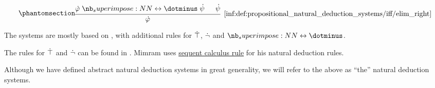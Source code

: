 \begin{definition}
\begin{thmenum}
\begin{paracol}{3}
      \begin{nthcolumn}{2}
        \ParacolAlignmentHack
        \begin{equation*}\taglabel[\ensuremath{ \leftrightarrow_{-R} }]{inf:def:propositional_natural_deduction_systems/iff/elim_right}
          \begin{prooftree}
            \hypo{ \syn\varphi \syniff \syn\psi }
            \hypo{ \syn\psi }
            \infer2[\ref{inf:def:propositional_natural_deduction_systems/iff/elim_right}]{ \syn\varphi }
          \end{prooftree}
        \end{equation*}
      \end{nthcolumn}
    \end{paracol}
  \end{thmenum}
\end{definition}
\begin{comments}
  \item The systems are mostly based on \cite[def. 2.1.1]{TroelstraSchwichtenberg2000BasicProofTheory}, with additional rules for \( \dot{\top} \), \( \dot{\neg} \) and \( \syniff \).

  The rules for \( \dot{\top} \) and \( \dot{\neg} \) can be found in \cite[fig. 2.5]{Mimram2020ProgramEqualsProof}. Mimram uses \hyperref[def:abstract_propositional_sequent_calculus_system]{sequent calculus rule} for his natural deduction rules.

  \item Although we have defined abstract natural deduction systems in great generality, we will refer to the above as \enquote{the} natural deduction systems.
\end{comments}

